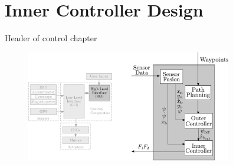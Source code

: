 \chapter{Inner Controller Design}

Header of control chapter

\begin{figure}[H]
    \includegraphics[width=0.8\textwidth]{figures/controllerDiagram}
    \caption{}
    \label{fig:controllerDiagram}
\end{figure}